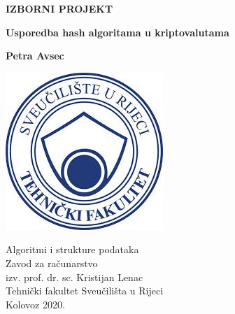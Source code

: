 \documentclass[12pt]{article}
\begin{document}
\begin{titlepage}
	\begin{center}
		
		
		\LARGE
		\textbf{IZBORNI PROJEKT} 
		
		\vspace{0.5cm}
		\LARGE
		\textbf{Usporedba hash algoritama u kriptovalutama} 
		
		\vspace{1.5cm}
		
		\Large
		\textbf{Petra Avsec}
		
		\vfill
		
		
		\includegraphics[scale=0.5,keepaspectratio]{slike/riteh}
		
		
		\Large
		Algoritmi i strukture podataka \\
		Zavod za računarstvo\\
		izv. prof. dr. sc. Kristijan Lenac \\
		Tehnički fakultet Sveučilišta u Rijeci \\
		Kolovoz 2020. 
		
		
	\end{center}
\end{titlepage}

\tableofcontents

\pagebreak
\end{document}

